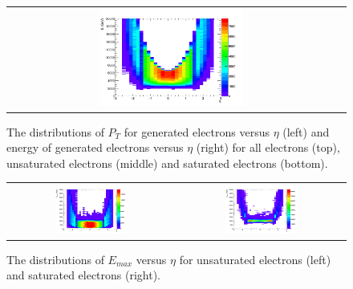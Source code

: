 \begin{figure}[bh]
\begin{center}
\begin{tabular}{cc}
      \includegraphics[width=0.45\textwidth]{chapters/Zprime/Saturation/images/FlatPt/Sample_variables/Emc_eta_s.png} \\
    \end{tabular}
    \caption{The distributions of $P_{T}$ for generated electrons versus $\eta$ (left) and energy of generated electrons versus $\eta$ (right) for all electrons (top), unsaturated electrons (middle) and saturated electrons (bottom).}
    \label{fig:Ptmc_Emc_eta}
  \end{center}
\end{figure}


\begin{figure}[bh]
  \begin{center}
    \begin{tabular}{cc}
      \includegraphics[width=0.45\textwidth]{chapters/Zprime/Saturation/images/FlatPt/Sample_variables/Emax_eta_nos.png} &
      \includegraphics[width=0.45\textwidth]{chapters/Zprime/Saturation/images/FlatPt/Sample_variables/Emax_eta_s.png} \\
    \end{tabular}
    \caption{The distributions of $E_{max}$ versus $\eta$ for unsaturated electrons (left) and saturated electrons (right).}
    \label{fig:Emax_eta}
  \end{center}
\end{figure}


